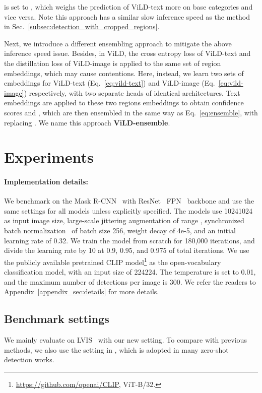 \documentclass{article} \usepackage{iclr2022_conference,times}
\begin{document}
 is set to , which weighs the prediction of ViLD-text more on base categories and vice versa. Note this approach has a similar slow inference speed as the method in Sec.~\ref{subsec:detection_with_cropped_regions}.

Next, we introduce a different ensembling approach to mitigate the above inference speed issue.
Besides, in ViLD, the cross entropy loss of ViLD-text and the  distillation loss of ViLD-image is applied to the same set of region embeddings, which may cause contentions.
Here, instead, we learn two sets of embeddings for ViLD-text (Eq.~\ref{eq:vild-text}) and ViLD-image (Eq.~\ref{eq:vild-image}) respectively, with two separate heads of identical architectures.
Text embeddings are applied to these two regions embeddings to obtain confidence scores  and , which are then ensembled in the same way as Eq.~\ref{eq:ensemble}, with  replacing . 
We name this approach \textbf{ViLD-ensemble}. 


\section{Experiments}\label{sec:experiments}
\paragraph{Implementation details:} We benchmark on the Mask R-CNN~\citep{he2017mask} with ResNet~\citep{resnet} FPN~\citep{fpn} backbone and use the same settings for all models unless explicitly specified.
The models use 10241024 as input image size, large-scale jittering augmentation of range , synchronized batch normalization~\citep{bn1,Detectron2018} of batch size 256, weight decay of 4e-5, and an initial learning rate of 0.32. We train the model from scratch for 180,000 iterations, and divide the learning rate by 10 at 0.9, 0.95, and 0.975 of total iterations. We use the publicly available pretrained CLIP model\footnote{\url{https://github.com/openai/CLIP}, ViT-B/32.} as the open-vocabulary classification model, with an input size of 224224.
The temperature  is set to 0.01, and the maximum number of detections per image is 300.
We refer the readers to Appendix~\ref{appendix_sec:details} for more details.

\subsection{Benchmark settings}
We mainly evaluate on LVIS~\citep{lvis} with our new setting. To compare with previous methods, we also use the setting in \citet{zareian2021openvocabulary}, which is adopted in many zero-shot detection works.
\end{document}
